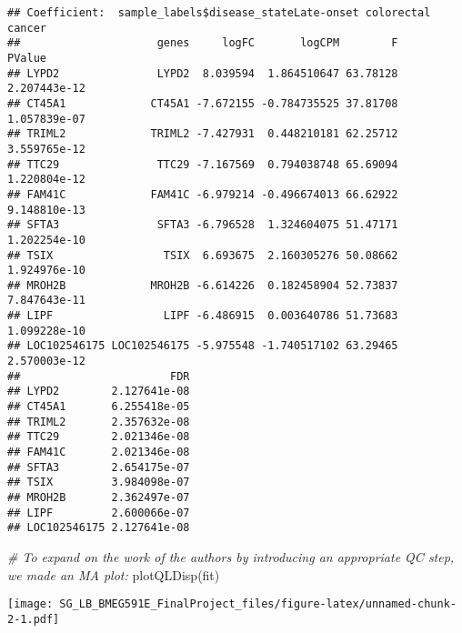 \documentclass[
]{article}
\newenvironment{Shaded}{\begin{snugshade}}{\end{snugshade}}
\newcommand{\CommentTok}[1]{\textcolor[rgb]{0.56,0.35,0.01}{\textit{#1}}}
\newcommand{\FunctionTok}[1]{\textcolor[rgb]{0.00,0.00,0.00}{#1}}
\newcommand{\NormalTok}[1]{#1}
\begin{document}
\begin{verbatim}
## Coefficient:  sample_labels$disease_stateLate-onset colorectal cancer 
##                     genes     logFC       logCPM        F       PValue
## LYPD2               LYPD2  8.039594  1.864510647 63.78128 2.207443e-12
## CT45A1             CT45A1 -7.672155 -0.784735525 37.81708 1.057839e-07
## TRIML2             TRIML2 -7.427931  0.448210181 62.25712 3.559765e-12
## TTC29               TTC29 -7.167569  0.794038748 65.69094 1.220804e-12
## FAM41C             FAM41C -6.979214 -0.496674013 66.62922 9.148810e-13
## SFTA3               SFTA3 -6.796528  1.324604075 51.47171 1.202254e-10
## TSIX                 TSIX  6.693675  2.160305276 50.08662 1.924976e-10
## MROH2B             MROH2B -6.614226  0.182458904 52.73837 7.847643e-11
## LIPF                 LIPF -6.486915  0.003640786 51.73683 1.099228e-10
## LOC102546175 LOC102546175 -5.975548 -1.740517102 63.29465 2.570003e-12
##                       FDR
## LYPD2        2.127641e-08
## CT45A1       6.255418e-05
## TRIML2       2.357632e-08
## TTC29        2.021346e-08
## FAM41C       2.021346e-08
## SFTA3        2.654175e-07
## TSIX         3.984098e-07
## MROH2B       2.362497e-07
## LIPF         2.600066e-07
## LOC102546175 2.127641e-08
\end{verbatim}

\begin{Shaded}
\begin{Highlighting}[]
\CommentTok{\# To expand on the work of the authors by introducing an appropriate QC step, we made an MA plot:}
\FunctionTok{plotQLDisp}\NormalTok{(fit)}
\end{Highlighting}
\end{Shaded}

\texttt{[image: SG\_LB\_BMEG591E\_FinalProject\_files/figure-latex/unnamed-chunk-2-1.pdf]}
\end{document}

